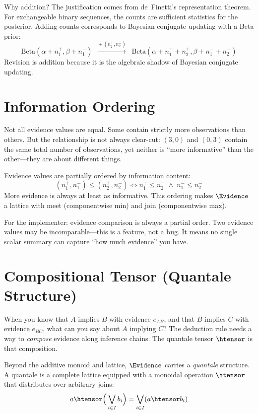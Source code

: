 \documentclass[11pt,openany]{report}
\begin{document}
Why addition?  The justification comes from de~Finetti's
representation theorem.  For exchangeable binary sequences, the counts
are sufficient statistics for the posterior.  Adding counts corresponds to
Bayesian conjugate updating with a Beta prior:
\[
  \text{Beta}(\alpha + n_1^+, \beta + n_1^-)
  \;\;\xrightarrow{+\;(n_2^+, n_2^-)}\;\;
  \text{Beta}(\alpha + n_1^+ + n_2^+, \beta + n_1^- + n_2^-)
\]
Revision is addition because it is the algebraic shadow of Bayesian
conjugate updating.

\section{Information Ordering}

Not all evidence values are equal.  Some contain strictly more
observations than others.  But the relationship is not always clear-cut:
$(3, 0)$ and $(0, 3)$ contain the same total number of observations, yet
neither is ``more informative'' than the other---they are about different
things.

Evidence values are partially ordered by information content:
\[
  (n_1^+, n_1^-) \le (n_2^+, n_2^-) \iff
  n_1^+ \le n_2^+ \;\wedge\; n_1^- \le n_2^-
\]
More evidence is always at least as informative.  This ordering makes
$\Evidence$ a lattice with meet (componentwise min) and join (componentwise
max).

For the implementer: evidence comparison is always a partial order.  Two
evidence values may be incomparable---this is a feature, not a bug.  It
means no single scalar summary can capture ``how much evidence'' you have.

\section{Compositional Tensor (Quantale Structure)}

When you know that $A$ implies $B$ with evidence $e_{AB}$, and that $B$
implies $C$ with evidence $e_{BC}$, what can you say about $A$ implying
$C$?  The deduction rule needs a way to \emph{compose} evidence along
inference chains.  The quantale tensor $\htensor$ is that composition.

Beyond the additive monoid and lattice, $\Evidence$ carries a
\emph{quantale} structure.  A quantale is a complete lattice equipped
with a monoidal operation $\htensor$ that distributes over arbitrary
joins:
\[
  a \htensor \Big(\bigvee_{i \in I} b_i\Big) = \bigvee_{i \in I} (a \htensor b_i)
\]
\end{document}
